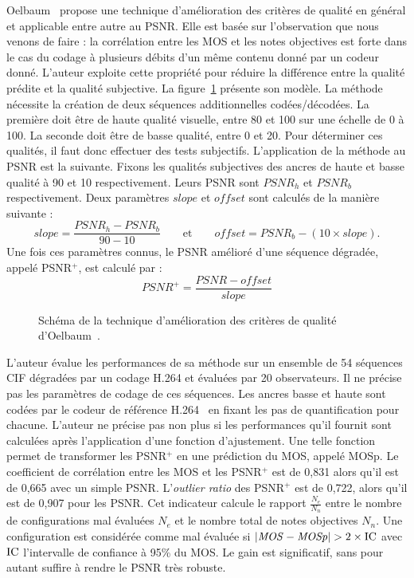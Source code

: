 Oelbaum~\cite{oelbaum-pcs2007} propose une technique d'amélioration des critères de qualité en général et applicable entre autre au PSNR. Elle est basée sur l'observation que nous venons de faire : la corrélation entre les MOS et les notes objectives est forte dans le cas du codage à plusieurs débits d'un même contenu donné par un codeur donné. L'auteur exploite cette propriété pour réduire la différence entre la qualité prédite et la qualité subjective. La figure~\ref{fig:methodOelbaum} présente son modèle. La méthode nécessite la création de deux séquences additionnelles codées/décodées. La première doit être de haute qualité visuelle, entre 80 et 100 sur une échelle de 0 à 100. La seconde doit être de basse qualité, entre 0 et 20. Pour déterminer ces qualités, il faut donc effectuer des tests subjectifs. L'application de la méthode au PSNR est la suivante. Fixons les qualités subjectives des ancres de haute et basse qualité à 90 et 10 respectivement. Leurs PSNR sont $\mathit{PSNR}_h$ et $\mathit{PSNR}_b$ respectivement. Deux paramètres $\mathit{slope}$ et $\mathit{offset}$ sont calculés de la manière suivante :
\begin{equation}
\mathit{slope}=\frac{\mathit{PSNR}_h - \mathit{PSNR}_b}{90-10}\qquad \text{et}\qquad \mathit{offset} = \mathit{PSNR}_b - (10\times \mathit{slope}).
\end{equation}
%
Une fois ces paramètres connus, le PSNR amélioré d'une séquence dégradée, appelé PSNR$^+$, est calculé par :
\begin{equation}
\mathit{PSNR}^+ = \frac{\mathit{PSNR} - \mathit{offset}}{\mathit{slope}}
\end{equation}

\begin{figure}[htbp]
	\centering
	\begin{tikzpicture}[text centered, node distance = 3cm]\end{tikzpicture}
	\caption{Schéma de la technique d'amélioration des critères de qualité d'Oelbaum~\cite{oelbaum-pcs2007}.}
	\label{fig:methodOelbaum}
\end{figure}

L'auteur évalue les performances de sa méthode sur un ensemble de 54 séquences CIF dégradées par un codage H.264 et évaluées par 20 observateurs. Il ne précise pas les paramètres de codage de ces séquences. Les ancres basse et haute sont codées par le codeur de référence H.264~\cite{h264-jm} en fixant les pas de quantification pour chacune. L'auteur ne précise pas non plus si les performances qu'il fournit sont calculées après l'application d'une fonction d'ajustement. Une telle fonction permet de transformer les PSNR$^+$ en une prédiction du MOS, appelé MOSp. Le coefficient de corrélation entre les MOS et les PSNR$^+$ est de 0,831 alors qu'il est de 0,665 avec un simple PSNR. L'\emph{outlier ratio} des PSNR$^+$ est de 0,722, alors qu'il est de 0,907 pour les PSNR. Cet indicateur calcule le rapport $\frac{N_{e}}{N_n}$ entre le nombre de configurations mal évaluées $N_e$ et le nombre total de notes objectives $N_n$. Une configuration est considérée comme mal évaluée si $|\MOS - \MOSp| > 2\times\IC$ avec $\IC$ l'intervalle de confiance à 95\% du MOS. Le gain est significatif, sans pour autant suffire à rendre le PSNR très robuste.

